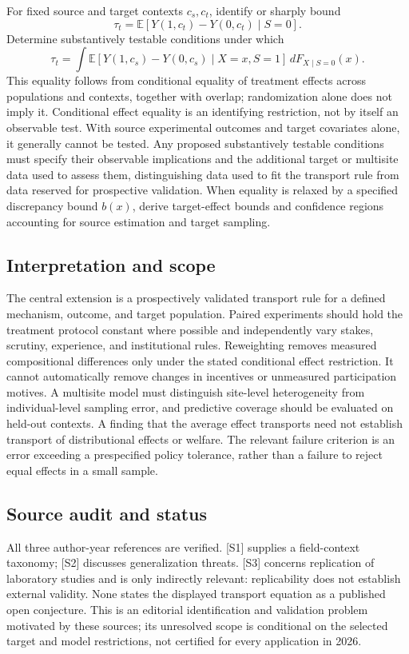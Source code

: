 \documentclass[11pt,a4paper]{article}
\begin{document}
For fixed source and target contexts $c_s,c_t$, identify or sharply bound
\[
\tau_t=\mathbb E[Y(1,c_t)-Y(0,c_t)\mid S=0].
\]
Determine substantively testable conditions under which
\[
\tau_t=\int \mathbb E[Y(1,c_s)-Y(0,c_s)\mid X=x,S=1]\,dF_{X\mid S=0}(x).
\]
This equality follows from conditional equality of treatment effects across populations and contexts, together with overlap; randomization alone does not imply it. Conditional effect equality is an identifying restriction, not by itself an observable test. With source experimental outcomes and target covariates alone, it generally cannot be tested. Any proposed substantively testable conditions must specify their observable implications and the additional target or multisite data used to assess them, distinguishing data used to fit the transport rule from data reserved for prospective validation. When equality is relaxed by a specified discrepancy bound $b(x)$, derive target-effect bounds and confidence regions accounting for source estimation and target sampling.

\subsection*{Interpretation and scope}

The central extension is a prospectively validated transport rule for a defined mechanism, outcome, and target population. Paired experiments should hold the treatment protocol constant where possible and independently vary stakes, scrutiny, experience, and institutional rules. Reweighting removes measured compositional differences only under the stated conditional effect restriction. It cannot automatically remove changes in incentives or unmeasured participation motives. A multisite model must distinguish site-level heterogeneity from individual-level sampling error, and predictive coverage should be evaluated on held-out contexts. A finding that the average effect transports need not establish transport of distributional effects or welfare. The relevant failure criterion is an error exceeding a prespecified policy tolerance, rather than a failure to reject equal effects in a small sample.

\subsection*{Source audit and status}

All three author-year references are verified. [S1] supplies a field-context taxonomy; [S2] discusses generalization threats. [S3] concerns replication of laboratory studies and is only indirectly relevant: replicability does not establish external validity. None states the displayed transport equation as a published open conjecture. This is an editorial identification and validation problem motivated by these sources; its unresolved scope is conditional on the selected target and model restrictions, not certified for every application in 2026.
\end{document}
